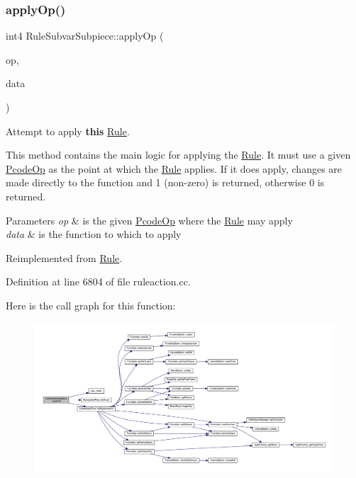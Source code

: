 \subsubsection{\texorpdfstring{applyOp()}{applyOp()}}
{\footnotesize\ttfamily int4 Rule\+Subvar\+Subpiece\+::apply\+Op (\begin{DoxyParamCaption}\item[{\mbox{\hyperlink{class_pcode_op}{Pcode\+Op}} $\ast$}]{op,  }\item[{\mbox{\hyperlink{class_funcdata}{Funcdata}} \&}]{data }\end{DoxyParamCaption})\hspace{0.3cm}{\ttfamily [virtual]}}



Attempt to apply {\bfseries{this}} \mbox{\hyperlink{class_rule}{Rule}}. 

This method contains the main logic for applying the \mbox{\hyperlink{class_rule}{Rule}}. It must use a given \mbox{\hyperlink{class_pcode_op}{Pcode\+Op}} as the point at which the \mbox{\hyperlink{class_rule}{Rule}} applies. If it does apply, changes are made directly to the function and 1 (non-\/zero) is returned, otherwise 0 is returned. 
\begin{DoxyParams}{Parameters}
{\em op} & is the given \mbox{\hyperlink{class_pcode_op}{Pcode\+Op}} where the \mbox{\hyperlink{class_rule}{Rule}} may apply \\
\hline
{\em data} & is the function to which to apply \\
\hline
\end{DoxyParams}


Reimplemented from \mbox{\hyperlink{class_rule_a4e3e61f066670175009f60fb9dc60848}{Rule}}.



Definition at line 6804 of file ruleaction.\+cc.

Here is the call graph for this function\+:
\nopagebreak
\begin{figure}[H]
\begin{center}
\leavevmode
\includegraphics[width=350pt]{class_rule_subvar_subpiece_aa55e18a43a85344e1e29c985d707a393_cgraph}
\end{center}
\end{figure}
\mbox{\label{class_rule_subvar_subpiece_aa771738e5e43bb05d600b22b7a6e191b}} 
